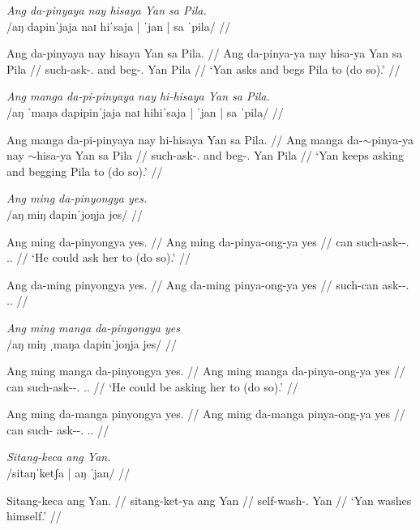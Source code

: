 \documentclass[12pt,a4paper]{scrartcl}
\newcommand{\TsgM}{{\Tsg}.{\M}}
\newcommand{\TsgF}{{\Tsg}.{\F}}
\newcommand{\til}{$\sim$} %
\begin{document}
\ex\begingl
\glpreamble \textit{Ang da-pinyaya nay hisaya Yan sa Pila.} \\
	/aŋ dapinˈjaja naɪ hiˈsaja | ˈjan | sa ˈpila/ //

	\gla Ang da-pinyaya nay hisaya Yan sa Pila. //
	\glb Ang da-pinya-ya nay hisa-ya Yan sa Pila //
	\glc \AgtT{} such-ask-\TsgM{} and beg-\TsgM{} Yan \Parg{} Pila //
	\glft `Yan asks and begs Pila to (do so).' //
\endgl\xe

\ex\begingl
\glpreamble \textit{Ang manga da-pi-pinyaya nay hi-hisaya Yan sa Pila.} \\
	/aŋ ˈmaŋa dapipinˈjaja naɪ hihiˈsaja | ˈjan | sa ˈpila/ //

	\gla Ang manga da-pi-pinyaya nay hi-hisaya Yan sa Pila. //
	\glb Ang manga da-\Iter{}\til{}pinya-ya nay \Iter{}\til{}hisa-ya Yan sa Pila //
	\glc \AgtT{} \Prog{} such-ask-\TsgM{} and beg-\TsgM{} Yan \Parg{} Pila //
	\glft `Yan keeps asking and begging Pila to (do so).' //
\endgl\xe

\pex
\a\begingl
\glpreamble \textit{Ang ming da-pinyongya yes.} \\
	/aŋ miŋ dapinˈjoŋja jes/ //

	\gla Ang ming da-pinyongya yes. //
	\glb Ang ming da-pinya-ong-ya yes //
	\glc \AgtT{} can such-ask-\Irr{}-\TsgM{} \TsgF{}.\Parg{} //
	\glft `He could ask her to (do so).' //
\endgl

\a\ljudge*\begingl
	\gla Ang da-ming pinyongya yes. //
	\glb Ang da-ming pinya-ong-ya yes //
	\glc \AgtT{} such-can ask-\Irr{}-\TsgM{} \TsgF{}.\Parg{} //
\endgl
\xe

\pex
\a\begingl
\glpreamble \textit{Ang ming manga da-pinyongya yes} \\
	/aŋ miŋ ˌmaŋa dapinˈjoŋja jes/ //

	\gla Ang ming manga da-pinyongya yes. //
	\glb Ang ming manga da-pinya-ong-ya yes //
	\glc \AgtT{} can \Prog{} such-ask-\Irr{}-\TsgM{} \TsgF{}.\Parg{} //
	\glft `He could be asking her to (do so).' //
\endgl

\a\ljudge*\begingl
	\gla Ang ming da-manga pinyongya yes. //
	\glb Ang ming da-manga pinya-ong-ya yes //
	\glc \AgtT{} can such-\Prog{} ask-\Irr{}-\TsgM{} \TsgF{}.\Parg{} //
\endgl
\xe

\ex\begingl
\glpreamble \textit{Sitang-keca ang Yan.}\\
	/sitaŋˈketʃa | aŋ ˈjan/ //

\gla Sitang-keca ang Yan. //
\glb sitang-ket-ya ang Yan //
\glc self-wash-\TsgM{} \Aarg{} Yan //
\glft `Yan washes himself.' //
\endgl\xe
\end{document}
